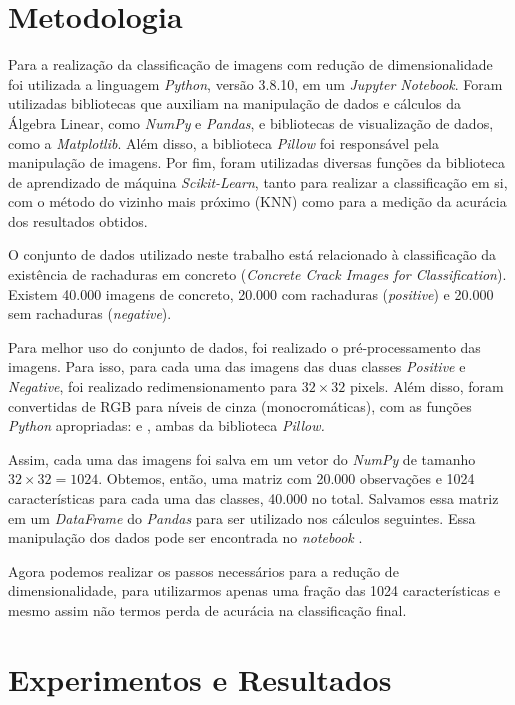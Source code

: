 \documentclass[a4paper, 12pt]{article}
\theoremstyle{definition}
\theoremstyle{remark}
\begin{document}
\newpage
\section{Metodologia}

Para a realização da classificação de imagens com redução de dimensionalidade foi utilizada a linguagem \textit{Python}, versão 3.8.10, em um \textit{Jupyter Notebook}. Foram utilizadas bibliotecas que auxiliam na manipulação de dados e cálculos da Álgebra Linear, como \textit{NumPy} e \textit{Pandas}, e bibliotecas de visualização de dados, como a \textit{Matplotlib}. Além disso, a biblioteca \textit{Pillow} foi responsável pela manipulação de imagens. Por fim, foram utilizadas diversas funções da biblioteca de aprendizado de máquina \textit{Scikit-Learn}, tanto para realizar a classificação em si, com o método do vizinho mais próximo (KNN) como para a medição da acurácia dos resultados obtidos.

O conjunto de dados utilizado neste trabalho está relacionado à classificação da existência de rachaduras em concreto (\textit{Concrete Crack Images for Classification}).\cite{dataset} Existem 40.000 imagens de concreto, 20.000 com rachaduras (\textit{positive}) e 20.000 sem rachaduras (\textit{negative}).

Para melhor uso do conjunto de dados, foi realizado o pré-processamento das imagens. Para isso, para cada uma das imagens das duas classes \textit{Positive} e \textit{Negative}, foi realizado redimensionamento para $32 \times 32$ pixels. Além disso, foram convertidas de RGB para níveis de cinza (monocromáticas), com as funções \textit{Python} apropriadas:  e , ambas da biblioteca \textit{Pillow.}

Assim, cada uma das imagens foi salva em um vetor do \textit{NumPy} de tamanho $32 \times 32 = 1024$. Obtemos, então, uma matriz com 20.000 observações e 1024 características para cada uma das classes, 40.000 no total. Salvamos essa matriz em um \textit{DataFrame} do \textit{Pandas} para ser utilizado nos cálculos seguintes. Essa manipulação dos dados pode ser encontrada no \textit{notebook} .

Agora podemos realizar os passos necessários para a redução de dimensionalidade, para utilizarmos apenas uma fração das 1024 características e mesmo assim não termos perda de acurácia na classificação final.

\newpage
\section{Experimentos e Resultados}
\end{document}
